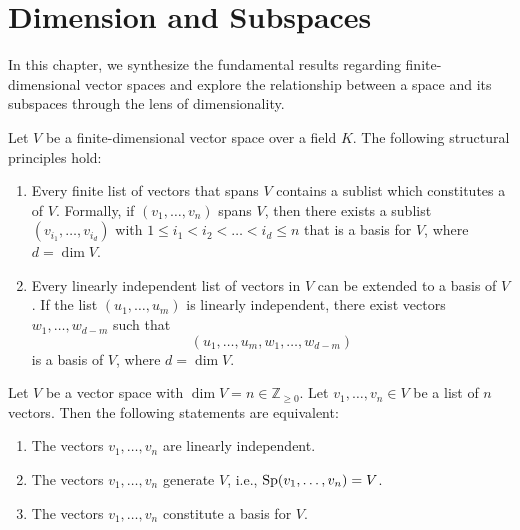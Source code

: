 \chapter{Dimension and Subspaces}
In this chapter, we synthesize the fundamental results regarding finite-dimensional vector spaces and explore the relationship between a space and its subspaces through the lens of dimensionality.

\begin{summary}
Let $V$ be a finite-dimensional vector space over a field $K$. The following structural principles hold:
\begin{enumerate}
    \item Every finite list of vectors that spans $V$ contains a sublist which constitutes a  of $V$. Formally, if $(v_1, \dots, v_n)$ spans $V$, then there exists a sublist $(v_{i_1}, \dots, v_{i_d})$ with $1 \le i_1 < i_2 < \dots < i_d \le n$ that is a basis for $V$, where $d = \dim V$.
    \item Every linearly independent list of vectors in $V$ can be extended to a basis of $V$. If the list $(u_1, \dots, u_m)$ is linearly independent, there exist vectors $w_1, \dots, w_{d-m}$ such that 
    \[(u_1, \dots, u_m, w_1, \dots, w_{d-m})\] 
    is a basis of $V$, where $d = \dim V$.
\end{enumerate}
\end{summary}

\begin{theorem}
\label{thm:12.1}
Let $V$ be a vector space with $\dim V = n \in \mathbb{Z}_{\ge 0}$. Let $v_1, \dots, v_n \in V$ be a list of $n$ vectors. Then the following statements are equivalent:
\begin{enumerate}
    \item[\textbf{(a)}] The vectors $v_1, \dots, v_n$ are linearly independent.
    \item[\textbf{(b)}] The vectors $v_1, \dots, v_n$ generate $V$, i.e., $\operatorname{Sp}(v_1, \dots, v_n) = V$.
    \item[\textbf{(c)}] The vectors $v_1, \dots, v_n$ constitute a basis for $V$.
\end{enumerate}
\end{theorem}

